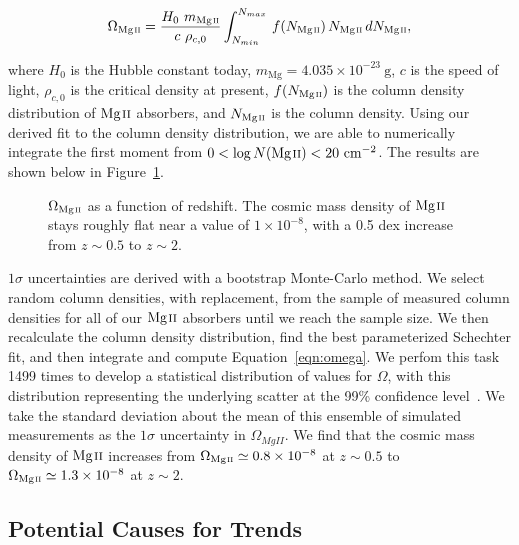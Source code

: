 \documentclass[iop,apj,numberedappendix,appendixfloats,twocolappendix]{emulateapj}
\begin{document}
\begin{equation}
\Omega_{\hbox{\scriptsize {\MgII}}} = \frac{H_0\  m_{\hbox{\scriptsize {\MgII}}}}{c\ \rho_{c,0}} \int_{N_{min}}^{N_{max}}\, f (N_{\hbox{\scriptsize {\MgII}}})\, N_{\hbox{\scriptsize {\MgII}}}\, dN_{\hbox{\scriptsize {\MgII}}} ,
\label{eqn:omega}
\end{equation}

\noindent where $H_0$ is the Hubble constant today, $m_{\mathrm{Mg}} = 4.035 \times 10^{-23}~\mathrm{g}$, $c$ is the speed of light, $\rho_{c,0}$ is the critical density at present, $f(N_{\hbox{\scriptsize {\MgII}}})$ is the column density distribution of ${\hbox{{\rm Mg}\kern 0.1em{\sc ii}}}$ absorbers, and $N_{\hbox{\scriptsize {\MgII}}}$ is the column density. Using our derived fit to the column density distribution, we are able to numerically integrate the first moment from $0 < \log N({\hbox{{\rm Mg}\kern 0.1em{\sc ii}}}) < 20~\mathrm{cm^{-2}}$. The results are shown below in Figure~\ref{fig:omegamgii}. 

\begin{figure}[bth]
\caption{$\Omega_{\hbox{\scriptsize {\MgII}}}$ as a function of redshift. The cosmic mass density of ${\hbox{{\rm Mg}\kern 0.1em{\sc ii}}}$ stays roughly flat near a value of $1 \times 10^{-8}$, with a 0.5 dex increase from $z \sim 0.5$ to $z \sim 2$.}
\label{fig:omegamgii}
\end{figure}

$1\sigma$ uncertainties are derived with a bootstrap Monte-Carlo method. We select random column densities, with replacement, from the sample of measured column densities for all of our ${\hbox{{\rm Mg}\kern 0.1em{\sc ii}}}$ absorbers until we reach the sample size. We then recalculate the column density distribution, find the best parameterized Schechter fit, and then integrate and compute Equation~\ref{eqn:omega}. We perfom this task 1499 times to develop a statistical distribution of values for $\Omega$, with this distribution representing the underlying scatter at the 99\% confidence level~\citep{Davidson2000bootstrap}. We take the standard deviation about the mean of this ensemble of simulated measurements as the $1\sigma$ uncertainty in $\Omega_{MgII}$. We find that the cosmic mass density of ${\hbox{{\rm Mg}\kern 0.1em{\sc ii}}}$ increases from $\Omega_{\hbox{\scriptsize {\MgII}}} \simeq 0.8\times10^{-8}$ at $z \sim 0.5$ to $\Omega_{\hbox{\scriptsize {\MgII}}} \simeq 1.3\times10^{-8}$ at $z \sim 2$. 

\subsection{Potential Causes for Trends}
\label{sec:trendcauses}
\end{document}
